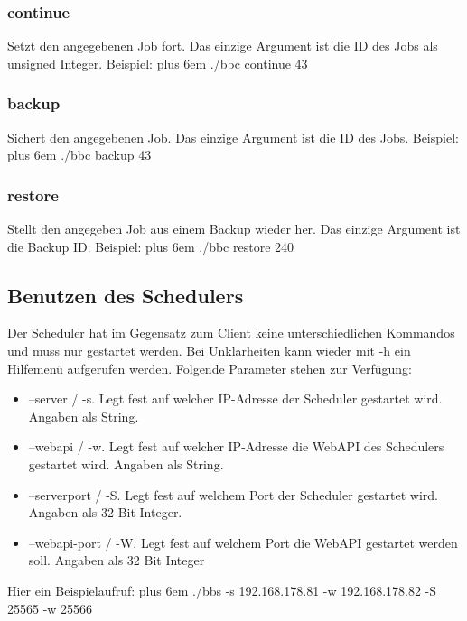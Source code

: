 \documentclass[a4paper,12pt]{article}
\makeatletter
\newenvironment{mycode}
 {\def\@xobeysp{\ }\verbatim\rightskip=0pt plus 6em\relax}
 {\endverbatim}
\makeatother
\begin{document}
\subsubsection{continue}
Setzt den angegebenen Job fort. Das einzige Argument ist die ID des Jobs als unsigned Integer. Beispiel: \newline
\begin{mycode}
	./bbc continue 43
\end{mycode}
\subsubsection{backup}
Sichert den angegebenen Job. Das einzige Argument ist die ID des Jobs. Beispiel:
\newline 
\begin{mycode}
	./bbc backup 43
\end{mycode}
\subsubsection{restore}
Stellt den angegeben Job aus einem Backup wieder her. Das einzige Argument ist die Backup ID. Beispiel: \newline
\begin{mycode}
	./bbc restore 240
\end{mycode}
\subsection{Benutzen des Schedulers}
Der Scheduler hat im Gegensatz zum Client keine unterschiedlichen Kommandos und muss nur gestartet werden. Bei Unklarheiten kann wieder mit -h ein Hilfemenü aufgerufen werden. Folgende Parameter stehen zur Verfügung:
\begin{itemize}
	\item --server / -s. Legt fest auf welcher IP-Adresse der Scheduler gestartet wird. Angaben als String.
	\item --webapi / -w. Legt fest auf welcher IP-Adresse die WebAPI des Schedulers gestartet wird. Angaben als String.
	\item --serverport / -S. Legt fest auf welchem Port der Scheduler gestartet wird. Angaben als 32 Bit Integer.
	\item --webapi-port / -W. Legt fest auf welchem Port die WebAPI gestartet werden soll. Angaben als 32 Bit Integer
\end{itemize}
Hier ein Beispielaufruf:
\begin{mycode}
	./bbs -s 192.168.178.81 -w 192.168.178.82 -S 25565 -w 25566
\end{mycode}
\end{document}
